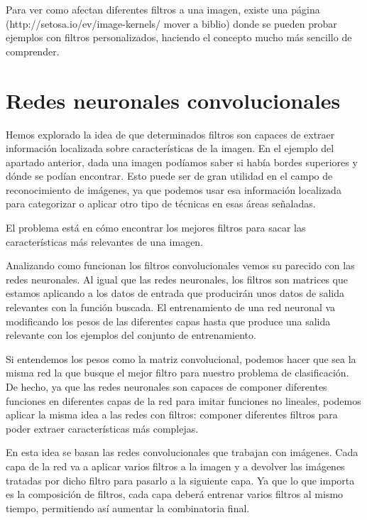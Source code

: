 Para ver como afectan diferentes filtros a una imagen, existe una página (http://setosa.io/ev/image-kernels/ mover a biblio) donde se pueden probar ejemplos con filtros personalizados, haciendo el concepto mucho más sencillo de comprender.

\section{Redes neuronales convolucionales}

Hemos explorado la idea de que determinados filtros son capaces de extraer información localizada sobre características de la imagen. En el ejemplo del apartado anterior, dada una imagen podíamos saber si había bordes superiores y dónde se podían encontrar. Esto puede ser de gran utilidad en el campo de reconocimiento de imágenes, ya que podemos usar esa información localizada para categorizar o aplicar otro tipo de técnicas en esas áreas señaladas.

El problema está en cómo encontrar los mejores filtros para sacar las características más relevantes de una imagen.

Analizando como funcionan los filtros convolucionales vemos su parecido con las redes neuronales. Al igual que las redes neuronales, los filtros son matrices que estamos aplicando a los datos de entrada que producirán unos datos de salida relevantes con la función buscada. El entrenamiento de una red neuronal va modificando los pesos de las diferentes capas hasta que produce una salida relevante con los ejemplos del conjunto de entrenamiento.

Si entendemos los pesos como la matriz convolucional, podemos hacer que sea la misma red la que busque el mejor filtro para nuestro problema de clasificación. De hecho, ya que las redes neuronales son capaces de componer diferentes funciones en diferentes capas de la red para imitar funciones no lineales, podemos aplicar la misma idea a las redes con filtros: componer diferentes filtros para poder extraer características más complejas.

En esta idea se basan las redes convolucionales que trabajan con imágenes. Cada capa de la red va a aplicar varios filtros a la imagen y a devolver las imágenes tratadas por dicho filtro para pasarlo a la siguiente capa. Ya que lo que importa es la composición de filtros, cada capa deberá entrenar varios filtros al mismo tiempo, permitiendo así aumentar la combinatoria final.

\begin{center}
\end{center}

